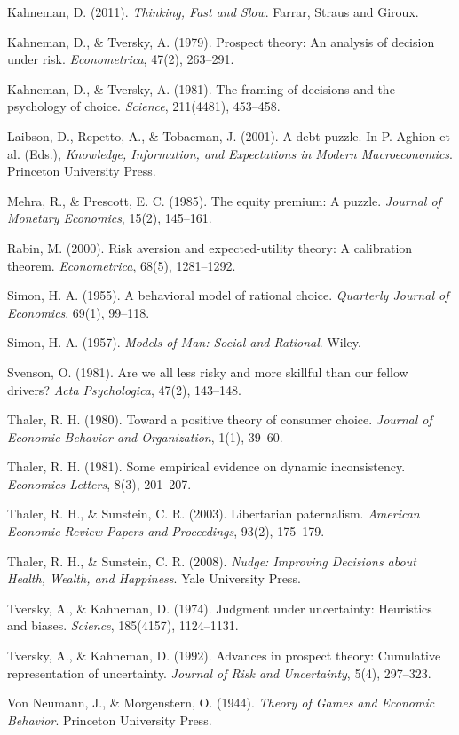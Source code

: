 \documentclass[12pt, letterpaper]{article}
\begin{document}
Kahneman, D. (2011). \textit{Thinking, Fast and Slow}. Farrar, Straus and Giroux.

Kahneman, D., \& Tversky, A. (1979). Prospect theory: An analysis of decision under risk. \textit{Econometrica}, 47(2), 263--291.

Kahneman, D., \& Tversky, A. (1981). The framing of decisions and the psychology of choice. \textit{Science}, 211(4481), 453--458.

Laibson, D., Repetto, A., \& Tobacman, J. (2001). A debt puzzle. In P. Aghion et al. (Eds.), \textit{Knowledge, Information, and Expectations in Modern Macroeconomics}. Princeton University Press.

Mehra, R., \& Prescott, E. C. (1985). The equity premium: A puzzle. \textit{Journal of Monetary Economics}, 15(2), 145--161.

Rabin, M. (2000). Risk aversion and expected-utility theory: A calibration theorem. \textit{Econometrica}, 68(5), 1281--1292.

Simon, H. A. (1955). A behavioral model of rational choice. \textit{Quarterly Journal of Economics}, 69(1), 99--118.

Simon, H. A. (1957). \textit{Models of Man: Social and Rational}. Wiley.

Svenson, O. (1981). Are we all less risky and more skillful than our fellow drivers? \textit{Acta Psychologica}, 47(2), 143--148.

Thaler, R. H. (1980). Toward a positive theory of consumer choice. \textit{Journal of Economic Behavior and Organization}, 1(1), 39--60.

Thaler, R. H. (1981). Some empirical evidence on dynamic inconsistency. \textit{Economics Letters}, 8(3), 201--207.

Thaler, R. H., \& Sunstein, C. R. (2003). Libertarian paternalism. \textit{American Economic Review Papers and Proceedings}, 93(2), 175--179.

Thaler, R. H., \& Sunstein, C. R. (2008). \textit{Nudge: Improving Decisions about Health, Wealth, and Happiness}. Yale University Press.

Tversky, A., \& Kahneman, D. (1974). Judgment under uncertainty: Heuristics and biases. \textit{Science}, 185(4157), 1124--1131.

Tversky, A., \& Kahneman, D. (1992). Advances in prospect theory: Cumulative representation of uncertainty. \textit{Journal of Risk and Uncertainty}, 5(4), 297--323.

Von Neumann, J., \& Morgenstern, O. (1944). \textit{Theory of Games and Economic Behavior}. Princeton University Press.
\end{document}
